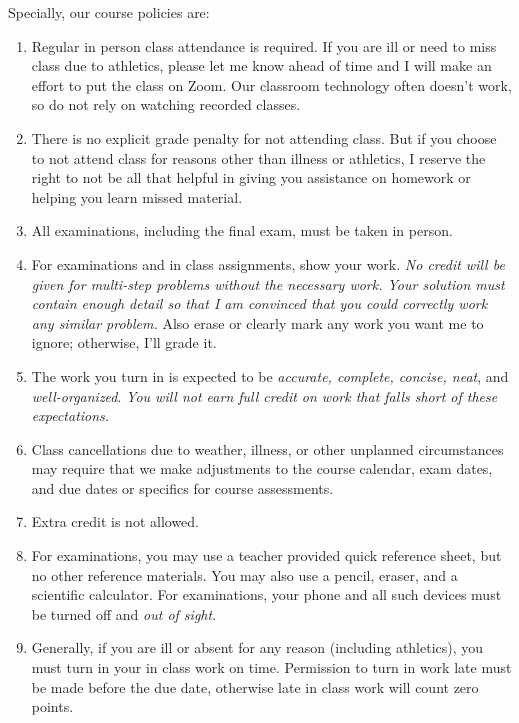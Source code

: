 \documentclass[12pt]{article}
\newcounter{ex}\setcounter{ex}{0}
\begin{document}
\normalsize
Specially, our course policies are:
\begin{enumerate}

\item Regular in person class attendance is required. If you are ill or need to miss 
class due to athletics, please let me know ahead of time and I will make an effort to put the class on Zoom. 
Our classroom technology often doesn't work, so do not rely on watching recorded classes.

\item There is no explicit grade penalty for not attending class. But if you choose to not attend class for reasons other
than illness or athletics, I reserve the right to not be all that helpful in giving you assistance on homework or helping 
you learn missed material.

\item All examinations, including the final exam, must be taken in person.

\item For examinations and in class assignments, show your work.  \emph{No credit will be given for multi-step problems without the necessary work. Your solution must contain enough detail
so that I am convinced that you could correctly work any similar problem.} Also erase or clearly mark any work you want me to ignore; otherwise,
I'll grade it.  

\item The work you turn in is expected to be \emph{accurate, 
complete, concise, neat}, and \emph{well-organized}.  
\emph{You will not earn full credit on work that falls short of 
these expectations.}

\item Class cancellations due to weather, illness, or other 
unplanned circumstances may require that we make  adjustments
to the course calendar, exam dates, and due dates or specifics for 
course assessments. 


\item Extra credit is not allowed. 



\item For examinations, you may use a teacher provided quick reference sheet, 
but no other reference materials. You may also use a pencil, eraser, 
and a scientific calculator. For examinations, your phone and all such
devices must be turned off and \emph{out of sight}. 

\item Generally, if you are ill or absent for any reason (including 
athletics), you must turn in your in class work on time. Permission to
turn in work late must be made before the due date, otherwise late in class work 
will count zero points.



\end{enumerate}
\end{document}
